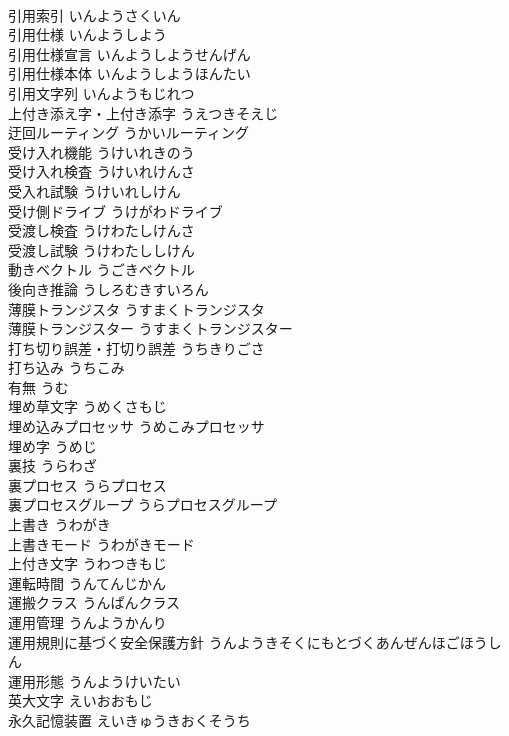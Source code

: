 \documentclass[8pt]{extreport}
\begin{document}
\begin{CJK}{UTF8}{min}
\\	引用索引	いんようさくいん	
\\	引用仕様	いんようしよう	
\\	引用仕様宣言	いんようしようせんげん	
\\	引用仕様本体	いんようしようほんたい	
\\	引用文字列	いんようもじれつ	
\\	上付き添え字・上付き添字	うえつきそえじ	
\\	迂回ルーティング	うかいルーティング	
\\	受け入れ機能	うけいれきのう	
\\	受け入れ検査	うけいれけんさ	
\\	受入れ試験	うけいれしけん	
\\	受け側ドライブ	うけがわドライブ	
\\	受渡し検査	うけわたしけんさ	
\\	受渡し試験	うけわたししけん	
\\	動きベクトル	うごきベクトル	
\\	後向き推論	うしろむきすいろん	
\\	薄膜トランジスタ	うすまくトランジスタ	
\\	薄膜トランジスター	うすまくトランジスター	
\\	打ち切り誤差・打切り誤差	うちきりごさ	
\\	打ち込み	うちこみ	
\\	有無	うむ	
\\	埋め草文字	うめくさもじ	
\\	埋め込みプロセッサ	うめこみプロセッサ	
\\	埋め字	うめじ	
\\	裏技	うらわざ	
\\	裏プロセス	うらプロセス	
\\	裏プロセスグループ	うらプロセスグループ	
\\	上書き	うわがき	
\\	上書きモード	うわがきモード	
\\	上付き文字	うわつきもじ	
\\	運転時間	うんてんじかん	
\\	運搬クラス	うんぱんクラス	
\\	運用管理	うんようかんり	
\\	運用規則に基づく安全保護方針	うんようきそくにもとづくあんぜんほごほうしん	
\\	運用形態	うんようけいたい	
\\	英大文字	えいおおもじ	
\\	永久記憶装置	えいきゅうきおくそうち	

\end{CJK}
\end{document}

